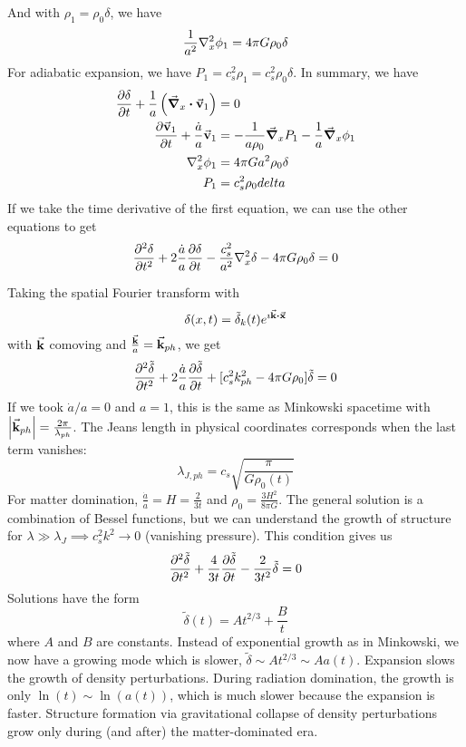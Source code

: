 \documentclass[a4paper,twoside,master.tex]{subfiles}
\begin{document}
And with $ \rho_1 = \rho_0 \delta $, we have
\begin{equation}
    \frac{1}{a^2} \laplacian_x{\phi_1} = 4 \pi G \rho_0 \delta
\end{equation}
For adiabatic expansion, we have $ P_1 = c_s^2 \rho_1 = c_s^2 \rho_0 \delta $. In summary, we have
\begin{align}
    \pdv{\delta}{t} + \frac{1}{a} \left( \grad_x \vdot \va{v}_1 \right) &= 0 \\
    \pdv{\va{v}_1}{t} + \frac{\dot{a}}{a} \va{v}_1 &= - \frac{1}{a \rho_0} \grad_x{P_1} - \frac{1}{a} \grad_x{\phi_1} \\
    \laplacian_x{\phi_1} &= 4 \pi G a^2 \rho_0 \delta \\
    P_1 &= c_s^2 \rho_0 delta
\end{align}
If we take the time derivative of the first equation, we can use the other equations to get
\begin{equation}
    \pdv[2]{\delta}{t} + 2 \frac{\dot{a}}{a} \pdv{\delta}{t} - \frac{c_s^2}{a^2} \laplacian_x{\delta} - 4 \pi G \rho_0 \delta = 0
\end{equation}

Taking the spatial Fourier transform with
\begin{equation}
    \delta(x,t) = \tilde{\delta}_k(t) e^{\imath \va{k} \vdot \va{x}}
\end{equation}
with $ \va{k} $ comoving and $ \frac{\va{k}}{a} = \va{k}_{ph} $, we get
\begin{equation}
    \pdv[2]{\tilde{\delta}}{t} + 2 \frac{\dot{a}}{a} \pdv{\tilde{\delta}}{t} + [c_s^2 k_{ph}^2 - 4 \pi G \rho_0] \tilde{\delta} = 0
\end{equation}
If we took $ \dot{a} / a = 0 $ and $ a = 1 $, this is the same as Minkowski spacetime with $ \abs{\va{k}_{ph}} = \frac{2 \pi}{\lambda_{ph}} $. The Jeans length in physical coordinates corresponds when the last term vanishes:
\begin{equation}
    \lambda_{J,ph} = c_s \sqrt{\frac{\pi}{G \rho_0(t)}}
\end{equation}
For matter domination, $ \frac{\dot{a}}{a} = H = \frac{2}{3t} $ and $ \rho_0 = \frac{3 H^2}{8 \pi G} $. The general solution is a combination of Bessel functions, but we can understand the growth of structure for $ \lambda \gg \lambda_J \implies c_s^2 k^2 \to 0 $ (vanishing pressure). This condition gives us
\begin{equation}
    \pdv[2]{\tilde{\delta}}{t} + \frac{4}{3t} \pdv{\tilde{\delta}}{t} - \frac{2}{3 t^2} \tilde{\delta} = 0
\end{equation}
Solutions have the form
\begin{equation}
    \tilde{\delta}(t) = A t^{2/3} + \frac{B}{t}
\end{equation}
where $ A $ and $ B $ are constants. Instead of exponential growth as in Minkowski, we now have a growing mode which is slower, $ \tilde{\delta} \sim A t^{2/3} \sim A a(t) $. Expansion slows the growth of density perturbations. During radiation domination, the growth is only $ \ln(t) \sim \ln(a(t)) $, which is much slower because the expansion is faster. Structure formation via gravitational collapse of density perturbations grow only during (and after) the matter-dominated era.
\end{document}
